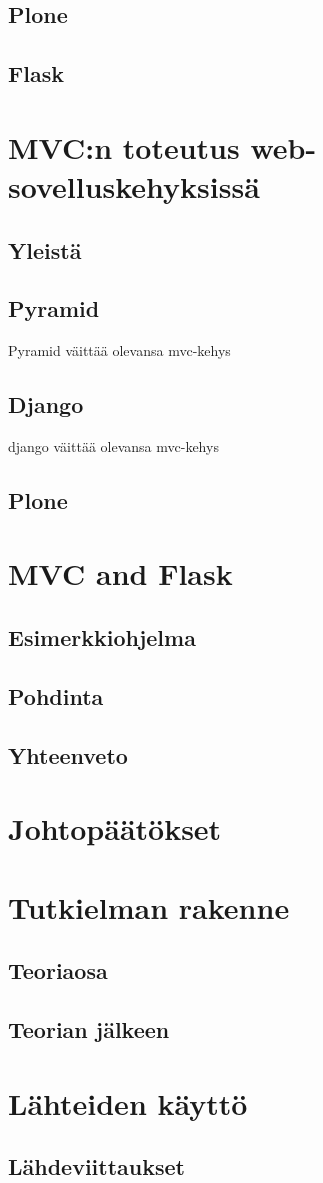 \documentclass[utf8]{gradu3}
\begin{document}
\section{Plone}
\section{Flask}

\chapter{MVC:n toteutus web-sovelluskehyksissä}
\section{Yleistä}
\section{Pyramid}
Pyramid väittää olevansa mvc-kehys
\section{Django}
django väittää olevansa mvc-kehys
\section{Plone}

\chapter{MVC and Flask}
\section{Esimerkkiohjelma}
\section{Pohdinta}
\section{Yhteenveto}

\chapter{Johtopäätökset}
\chapter{Tutkielman rakenne}
\section{Teoriaosa}
\section{Teorian jälkeen}
\chapter{Lähteiden käyttö}
\section{Lähdeviittaukset}

\printbibliography
\end{document}

